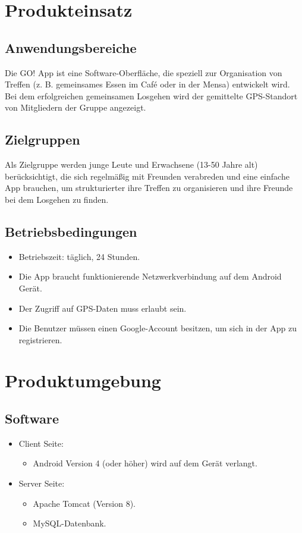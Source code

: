 \documentclass[parskip=full]{scrartcl}
\begin{document}
\newpage
\section{Produkteinsatz}
\subsection{Anwendungsbereiche}
Die GO! App ist eine Software-Oberfläche, die speziell zur Organisation von Treffen (z. B. gemeinsames Essen im Café oder in der Mensa) entwickelt wird. Bei dem erfolgreichen gemeinsamen Losgehen wird der gemittelte GPS-Standort von Mitgliedern der Gruppe angezeigt.
 
\subsection{Zielgruppen}
Als Zielgruppe werden junge Leute und Erwachsene (13-50 Jahre alt) berücksichtigt, die sich regelmäßig mit Freunden verabreden und eine einfache App brauchen, um strukturierter ihre Treffen zu organisieren und ihre Freunde bei dem Losgehen zu finden.

\subsection{Betriebsbedingungen}\label{Betriebsbedingungen}
\begin{itemize}
	\item Betriebszeit: täglich, 24 Stunden.
	\item Die App braucht funktionierende Netzwerkverbindung auf dem Android Gerät.
	\item Der Zugriff auf GPS-Daten muss erlaubt sein.
	\item Die Benutzer müssen einen \gls{Google-Account} besitzen, um sich in der App zu registrieren.
\end{itemize}

\newpage
\section{Produktumgebung}

\subsection{Software}
\begin{itemize}
	\item Client Seite:
	\begin{itemize}
		\item Android Version 4 (oder höher) wird auf dem Gerät verlangt.
	\end{itemize}
	
	\item Server Seite:
	\begin{itemize} 
        \item Apache Tomcat (Version 8).
		\item MySQL-Datenbank. %
    \end{itemize}
\end{itemize}
\end{document}
